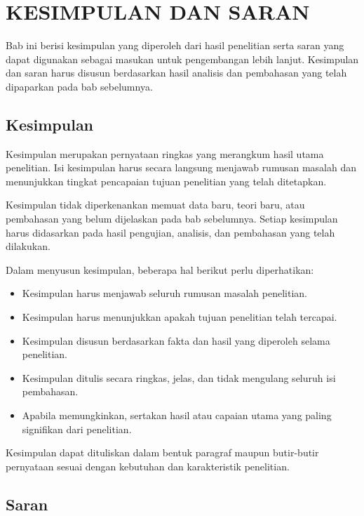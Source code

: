 \chapter{\MakeUppercase{Kesimpulan dan Saran}}

Bab ini berisi kesimpulan yang diperoleh dari hasil penelitian serta saran yang dapat digunakan sebagai masukan untuk pengembangan lebih lanjut. Kesimpulan dan saran harus disusun berdasarkan hasil analisis dan pembahasan yang telah dipaparkan pada bab sebelumnya.

\section{Kesimpulan}

Kesimpulan merupakan pernyataan ringkas yang merangkum hasil utama penelitian. Isi kesimpulan harus secara langsung menjawab rumusan masalah dan menunjukkan tingkat pencapaian tujuan penelitian yang telah ditetapkan.

Kesimpulan tidak diperkenankan memuat data baru, teori baru, atau pembahasan yang belum dijelaskan pada bab sebelumnya. Setiap kesimpulan harus didasarkan pada hasil pengujian, analisis, dan pembahasan yang telah dilakukan.

Dalam menyusun kesimpulan, beberapa hal berikut perlu diperhatikan:

\begin{itemize}[topsep=0pt,itemsep=0pt,parsep=0pt,leftmargin=*]
\item Kesimpulan harus menjawab seluruh rumusan masalah penelitian.
\item Kesimpulan harus menunjukkan apakah tujuan penelitian telah tercapai.
\item Kesimpulan disusun berdasarkan fakta dan hasil yang diperoleh selama penelitian.
\item Kesimpulan ditulis secara ringkas, jelas, dan tidak mengulang seluruh isi pembahasan.
\item Apabila memungkinkan, sertakan hasil atau capaian utama yang paling signifikan dari penelitian.
\end{itemize}

Kesimpulan dapat dituliskan dalam bentuk paragraf maupun butir-butir pernyataan sesuai dengan kebutuhan dan karakteristik penelitian.

\section{Saran}


